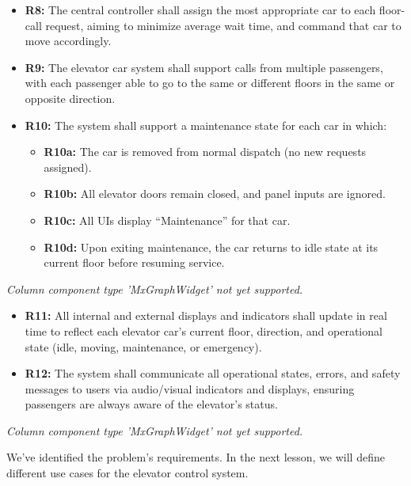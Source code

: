 \noindent
\begin{minipage}[t]{0.48\textwidth}\vspace{0pt}
\begin{itemize}
\item
\textbf{R8:} The central controller shall assign the most appropriate car to each floor-call request, aiming to minimize average wait time, and command that car to move accordingly.
\item
\textbf{R9:} The elevator car system shall support calls from multiple passengers, with each passenger able to go to the same or different floors in the same or opposite direction.
\item
\textbf{R10:} The system shall support a maintenance state for each car in which:

\begin{itemize}
\item
\textbf{R10a:} The car is removed from normal dispatch (no new requests assigned).
\item
\textbf{R10b:} All elevator doors remain closed, and panel inputs are ignored.
\item
\textbf{R10c:} All UIs display ``Maintenance'' for that car.
\item
\textbf{R10d:} Upon exiting maintenance, the car returns to idle state at its current floor before resuming service.
\end{itemize}
\end{itemize}
\end{minipage}
\hfill
\begin{minipage}[t]{0.48\textwidth}\vspace{0pt}
\textit{Column component type 'MxGraphWidget' not yet supported.}
\end{minipage}

\noindent
\begin{minipage}[t]{0.48\textwidth}\vspace{0pt}
\begin{itemize}
\item
\textbf{R11:} All internal and external displays and indicators shall update in real time to reflect each elevator car's current floor, direction, and operational state (idle, moving, maintenance, or emergency).
\item
\textbf{R12:} The system shall communicate all operational states, errors, and safety messages to users via audio/visual indicators and displays, ensuring passengers are always aware of the elevator's status.
\end{itemize}
\end{minipage}
\hfill
\begin{minipage}[t]{0.48\textwidth}\vspace{0pt}
\textit{Column component type 'MxGraphWidget' not yet supported.}
\end{minipage}

We've identified the problem's requirements. In the next lesson, we will define different use cases for the elevator control system.

